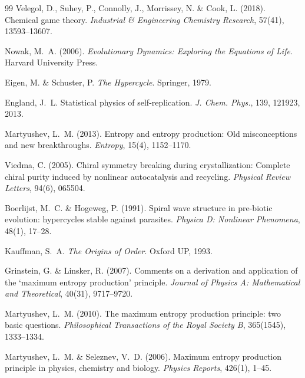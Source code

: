 \documentclass[12pt,a4paper]{article}
\theoremstyle{remark}
\begin{document}
\begin{thebibliography}{99}
Velegol, D., Suhey, P., Connolly, J., Morrissey, N. \& Cook, L. (2018).
\newblock Chemical game theory.
\newblock \textit{Industrial \& Engineering Chemistry Research}, 57(41), 13593--13607.

Nowak, M.~A. (2006).
\newblock \textit{Evolutionary Dynamics: Exploring the Equations of Life}.
\newblock Harvard University Press.

Eigen, M. \& Schuster, P.
\newblock \textit{The Hypercycle}.
\newblock Springer, 1979.

England, J.~L.
\newblock Statistical physics of self-replication.
\newblock \textit{J. Chem. Phys.}, 139, 121923, 2013.

Martyushev, L.~M. (2013).
\newblock Entropy and entropy production: Old misconceptions and new breakthroughs.
\newblock \textit{Entropy}, 15(4), 1152--1170.


Viedma, C. (2005).
\newblock Chiral symmetry breaking during crystallization: Complete chiral purity induced by nonlinear autocatalysis and recycling.
\newblock \textit{Physical Review Letters}, 94(6), 065504.

Boerlijst, M.~C. \& Hogeweg, P. (1991).
\newblock Spiral wave structure in pre-biotic evolution: hypercycles stable against parasites.
\newblock \textit{Physica D: Nonlinear Phenomena}, 48(1), 17--28.

Kauffman, S.~A.
\newblock \textit{The Origins of Order}.
\newblock Oxford UP, 1993.

Grinstein, G. \& Linsker, R. (2007).
\newblock Comments on a derivation and application of the `maximum entropy production' principle.
\newblock \textit{Journal of Physics A: Mathematical and Theoretical}, 40(31), 9717--9720.

Martyushev, L.~M. (2010).
\newblock The maximum entropy production principle: two basic questions.
\newblock \textit{Philosophical Transactions of the Royal Society B}, 365(1545), 1333--1334.

Martyushev, L.~M. \& Seleznev, V.~D. (2006).
\newblock Maximum entropy production principle in physics, chemistry and biology.
\newblock \textit{Physics Reports}, 426(1), 1--45.


\end{thebibliography}
\end{document}
